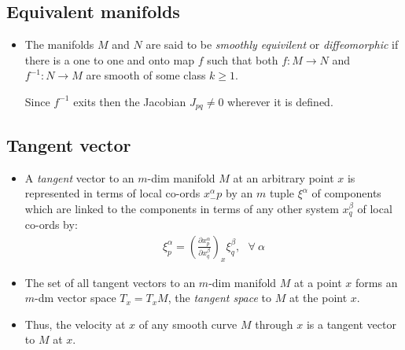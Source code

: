 \documentclass[11pt]{article}
\numberwithin{equation}{section}
\begin{document}
\subsection{Equivalent manifolds}
\begin{itemize}
  \item The manifolds $M$ and $N$ are said to be \emph{smoothly equivilent} or \emph{diffeomorphic} if there is a one to one and onto map $f$ such that both $f:M \rightarrow N$ and $f^{-1}:N \rightarrow M$ are smooth of some class $k\geq 1$. 

  Since $f^{-1}$ exits then the Jacobian $J_{pq} \neq 0 $ wherever it is defined. 
\end{itemize}

\subsection{Tangent vector}
\begin{itemize}
  \item A \emph{tangent} vector to an $m$-dim manifold $M$ at an arbitrary point $x$ is represented in terms of local co-ords $x^{\alpha}_-p$ by an $m$ tuple $\xi^{\alpha}$ of components which are linked to the components in terms of any other system $x^{\beta}_{q}$ of local co-ords by:
  \begin{align}
  \label{tangent}
    \xi^{\alpha}_{p} = \left(\frac{\partial x^{\alpha}_{p}}{\partial x^{\beta}_{q}}\right)_{x} \xi^{\beta}_{q},~~~\forall~ \alpha
  \end{align}

  \item The set of all tangent vectors to an $m$-dim manifold $M$ at a point $x$ forms an $m$-dm vector space $T_{x} = T_{x}M$, the \emph{tangent space} to $M$ at the point $x$. 

   \item Thus, the velocity at $x$ of any smooth curve $M$ through $x$ is a tangent vector to $M$ at $x$. 
\end{itemize}
\end{document}
